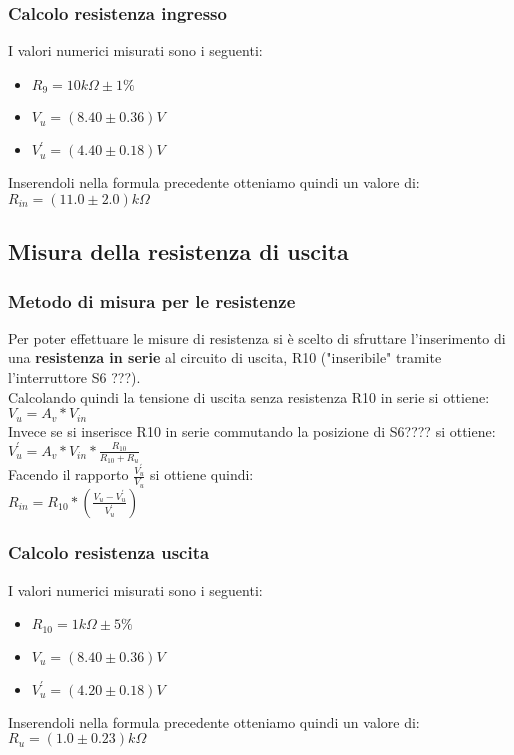 \documentclass{article}
\begin{document}
\subsubsection{Calcolo resistenza ingresso}
I valori numerici misurati sono i seguenti:
\begin{itemize}
    \item \large $R_{9} = 10k\Omega \pm 1\%$
    \item \large $V_{u} = (8.40 \pm 0.36)V$
    \item \large $V_{u}^{'} = (4.40 \pm 0.18)V$
\end{itemize}
Inserendoli nella formula precedente otteniamo quindi un valore di: \\ \large $R_{in} = (11.0 \pm 2.0)k\Omega$

\subsection{Misura della resistenza di uscita}
\subsubsection{Metodo di misura per le resistenze}
Per poter effettuare le misure di resistenza si è scelto di sfruttare l'inserimento di una \textbf{resistenza in serie} al circuito di uscita, R10 ("inseribile" tramite l'interruttore S6 ???).\\Calcolando quindi la tensione di uscita senza resistenza R10 in serie si ottiene:\\
\large $V_{u} = A_{v} * V_{in}$ \normalsize \\ Invece se si inserisce R10 in serie commutando la posizione di S6???? si ottiene:\\
\large $ V_{u}^{'} = A_{v} * V_{in} * \frac{R_{10}}{R_{10} + R_u} $ \normalsize \\ Facendo il rapporto \large $\frac{V_{u}^{'}}{{V_u}}$ \normalsize si ottiene quindi: \\ \large $R_{in} = R_{10} * (\frac{V_{u}-V_{u}^{'}}{V_{u}^{'}}) $ \normalsize
\subsubsection{Calcolo resistenza uscita}
I valori numerici misurati sono i seguenti:
\begin{itemize}
    \item \large $R_{10} = 1k\Omega \pm 5\%$
    \item \large $V_{u} = (8.40 \pm 0.36)V$
    \item \large $V_{u}^{'} = (4.20 \pm 0.18)V$
\end{itemize}
Inserendoli nella formula precedente otteniamo quindi un valore di: \\ \large $R_{u} = (1.0 \pm 0.23)k\Omega$
\end{document}
